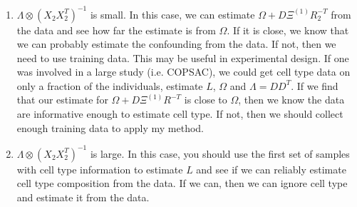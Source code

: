 \documentclass{article}
\begin{document}
\begin{enumerate}
\item $\Lambda \otimes \left( X_2 X_2^T \right)^{-1}$ is small. In this case, we can estimate $\Omega + D\Xi^{(1)}R_2^{-T}$ from the data and see how far the estimate is from $\Omega$. If it is close, we know that we can probably estimate the confounding from the data. If not, then we need to use training data. This may be useful in experimental design. If one was involved in a large study (i.e. COPSAC), we could get cell type data on only a fraction of the individuals, estimate $L$, $\Omega$ and $\Lambda = DD^T$. If we find that our estimate for $\Omega + D\Xi^{(1)}R^{-T}$ is close to $\Omega$, then we know the data are informative enough to estimate cell type. If not, then we should collect enough training data to apply my method.
\item $\Lambda \otimes \left( X_2 X_2^T \right)^{-1}$ is large. In this case, you should use the first set of samples with cell type information to estimate $L$ and see if we can reliably estimate cell type composition from the data. If we can, then we can ignore cell type and estimate it from the data.
\end{enumerate}
\end{document}
